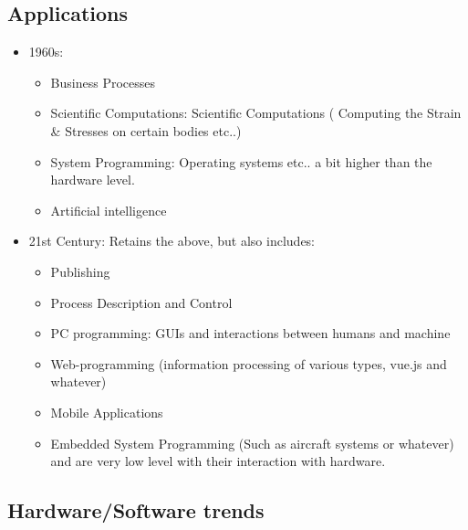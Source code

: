     \subsection{Applications}
        \begin{itemize}
            \item 1960s: \begin{itemize}
                \item Business Processes
                \item Scientific Computations: Scientific Computations ( Computing the Strain \& Stresses on certain bodies etc..)
                \item System Programming: Operating systems etc.. a bit higher than the hardware level.
                \item Artificial intelligence
            \end{itemize}
            \item 21st Century: Retains the above, but also includes: \begin{itemize}
                \item Publishing
                \item Process Description and Control
                \item PC programming: GUIs and interactions between humans and machine
                \item Web-programming (information processing of various types, vue.js and whatever)
                \item Mobile Applications
                \item Embedded System Programming (Such as aircraft systems or whatever) and are very low level with their interaction with hardware.
            \end{itemize}
        \end{itemize}
    
    \subsection{Hardware/Software trends}
